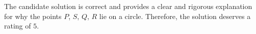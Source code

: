The candidate solution is correct and provides a clear and rigorous explanation for why the points \(P\), \(S\), \(Q\), \(R\) lie on a circle. Therefore, the solution deserves a rating of $\boxed{5}$.
